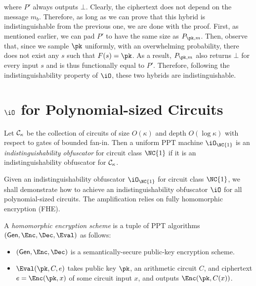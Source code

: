 where $P'$ always outputs $\bot$. Clearly, the ciphertext does not depend on the message $m_b$. Therefore, as long as we can prove that this hybrid is indistinguishable from the previous one, we are done with the proof. First, as mentioned earlier, we can pad $P'$ to have the same size as $P_{\pk, m}$. Then, observe that, since we sample $\pk$ uniformly, with an overwhelming probability, there does not exist any $s$ such that $F(s) = \pk$. As a result, $P_{\pk, m}$ also returns $\bot$ for every input $s$ and is thus functionally equal to $P'$. Therefore, following the indistinguishability property of $\iO$, these two hybrids are indistinguishable.

\section{$\iO$ for Polynomial-sized Circuits}


\begin{definition}
Let $\mathcal{C}_{\kappa}$ be the collection of circuits of size $O(\kappa)$ and depth
$O(\log{\kappa})$ with respect to gates of bounded fan-in.
Then a uniform PPT machine $\iO_{\NC{1}}$ is an
\emph{indistinguishability obfuscator} for circuit class $\NC{1}$ if it
is an indistinguishability obfuscator for $\mathcal{C}_{\kappa}$.
\end{definition}

Given an indistinguishability obfuscator $\iO_{\NC{1}}$ for circuit
class $\NC{1}$, we shall demonstrate how to achieve an
indistinguishability obfuscator $\iO$ for all polynomial-sized circuits.
The amplification relies on fully homomorphic encryption (FHE).

\newcommand{\GEN}{\ensuremath{\mathsf{Gen}}}

\begin{definition}
A \emph{homomorphic encryption scheme} is a tuple of PPT algorithms
$(\GEN, \Enc, \Dec, \Eval)$ as follows:
\begin{itemize}
\item
	$(\GEN, \Enc, \Dec)$ is a semantically-secure public-key
	encryption scheme.
\item
	$\Eval(\pk, C, e)$ takes public key $\pk$, an arithmetic circuit
	$C$, and ciphertext $e = \Enc(\pk, x)$ of some circuit input
	$x$, and outputs $\Enc(\pk, C(x))$.
\end{itemize}
\end{definition}

